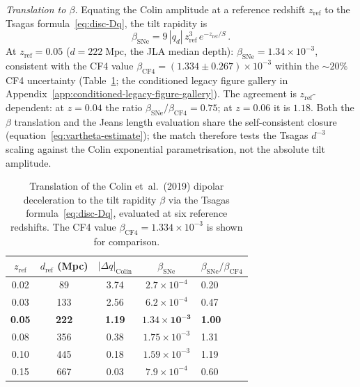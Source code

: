 \emph{Translation to $\beta$.}
Equating the Colin amplitude at a reference redshift $z_{\mathrm{ref}}$
to the Tsagas formula~\eqref{eq:disc-Dq}, the tilt rapidity is
\begin{equation}\label{eq:disc-betaSNe}
\beta_{\mathrm{SNe}}
= 9\,|q_d|\,z_{\mathrm{ref}}^3\,e^{-z_{\mathrm{ref}}/S}\,.
\end{equation}
At $z_{\mathrm{ref}} = 0.05$ ($d = 222\;\mathrm{Mpc}$, the JLA
median depth):
$\beta_{\mathrm{SNe}} = 1.34 \times 10^{-3}$, consistent
with the CF4 value
$\beta_{\mathrm{CF4}} = (1.334 \pm 0.267) \times 10^{-3}$
within the $\sim\!20\%$ CF4 uncertainty
(Table~\ref{tab:colin-beta}; the conditioned legacy figure gallery in Appendix~\ref{app:conditioned-legacy-figure-gallery}).  The agreement is
$z_{\mathrm{ref}}$-dependent: at $z = 0.04$ the ratio
$\beta_{\mathrm{SNe}}/\beta_{\mathrm{CF4}} = 0.75$; at $z = 0.06$
it is $1.18$.  Both the $\beta$ translation and the Jeans length
evaluation share the self-consistent closure
(equation~\eqref{eq:vartheta-estimate}); the match therefore
tests the Tsagas $d^{-3}$ scaling against the Colin exponential
parametrisation, not the absolute tilt amplitude.

\begin{table}[t]
\centering
\footnotesize
\setlength{\tabcolsep}{4pt}
\caption{Translation of the Colin et~al.\ (2019) dipolar
deceleration to the tilt rapidity $\beta$ via the Tsagas
formula~\eqref{eq:disc-Dq}, evaluated at six reference
redshifts.  The CF4 value
$\beta_{\mathrm{CF4}} = 1.334 \times 10^{-3}$ is shown
for comparison.}
\label{tab:colin-beta}
\begin{tabular}{ccccl}
\toprule
$z_{\mathrm{ref}}$ & $d_{\mathrm{ref}}$ (Mpc) &
  $|\Delta q|_{\mathrm{Colin}}$ &
  $\beta_{\mathrm{SNe}}$ &
  $\beta_{\mathrm{SNe}}/\beta_{\mathrm{CF4}}$ \\
\midrule
0.02 &  89 & 3.74 & $2.7 \times 10^{-4}$ & 0.20 \\
0.03 & 133 & 2.56 & $6.2 \times 10^{-4}$ & 0.47 \\
\textbf{0.05} & \textbf{222} & \textbf{1.19} &
  $\mathbf{1.34 \times 10^{-3}}$ & \textbf{1.00} \\
0.08 & 356 & 0.38 & $1.75 \times 10^{-3}$ & 1.31 \\
0.10 & 445 & 0.18 & $1.59 \times 10^{-3}$ & 1.19 \\
0.15 & 667 & 0.03 & $7.9 \times 10^{-4}$  & 0.60 \\
\bottomrule
\end{tabular}
\end{table}

